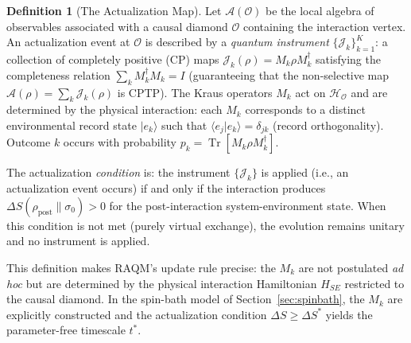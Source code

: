\documentclass[11pt,a4paper]{article}
\theoremstyle{plain}
\theoremstyle{definition}
\newtheorem{definition}[theorem]{Definition}
\theoremstyle{remark}
\newcommand{\inst}{\mathcal{J}}          %
\begin{document}
\begin{definition}[The Actualization Map]
\label{def:actualization_map}
Let $\mathcal{A}(\mathcal{O})$ be the local algebra of observables
associated with a causal diamond $\mathcal{O}$ containing the interaction
vertex. An actualization event at $\mathcal{O}$ is described by a
\emph{quantum instrument} $\{\inst_k\}_{k=1}^K$: a collection of
completely positive (CP) maps $\inst_k(\rho) = M_k \rho M_k^\dagger$
satisfying the completeness relation
$\sum_k M_k^\dagger M_k = I$
(guaranteeing that the non-selective map
$\mathcal{A}(\rho) = \sum_k \inst_k(\rho)$ is CPTP). The Kraus operators
$M_k$ act on $\mathcal{H}_{\mathcal{O}}$ and are determined by the
physical interaction: each $M_k$ corresponds to a distinct environmental
record state $|e_k\rangle$ such that $\langle e_j | e_k \rangle
= \delta_{jk}$ (record orthogonality). Outcome $k$ occurs with
probability $p_k = \operatorname{Tr}[M_k \rho M_k^\dagger]$.

The actualization \emph{condition} is: the instrument $\{\inst_k\}$ is
applied (i.e., an actualization event occurs) if and only if the
interaction produces $\Delta S(\rho_{\mathrm{post}}\|\sigma_0) > 0$
for the post-interaction system-environment state. When this condition
is not met (purely virtual exchange), the evolution remains unitary and
no instrument is applied.
\end{definition}

\noindent
This definition makes RAQM's update rule precise: the $M_k$ are not
postulated \textit{ad hoc} but are determined by the physical interaction
Hamiltonian $H_{SE}$ restricted to the causal diamond. In the spin-bath
model of Section~\ref{sec:spinbath}, the $M_k$ are explicitly constructed
and the actualization condition $\Delta S \geq \Delta S^*$ yields the
parameter-free timescale $t^*$.
\end{document}
